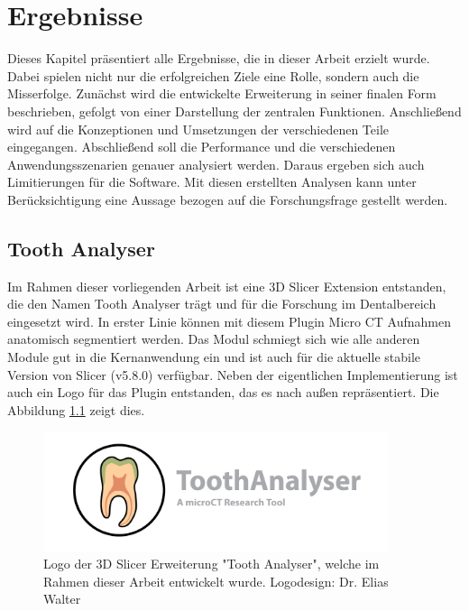\chapter{Ergebnisse}
\label{chap:ergebnisse} Dieses Kapitel präsentiert alle Ergebnisse, die in
dieser Arbeit erzielt wurde. Dabei spielen nicht nur die erfolgreichen Ziele eine
Rolle, sondern auch die Misserfolge. Zunächst wird die entwickelte Erweiterung in
seiner finalen Form beschrieben, gefolgt von einer Darstellung der zentralen
Funktionen. Anschließend wird auf die Konzeptionen und Umsetzungen der verschiedenen
Teile eingegangen. Abschließend soll die Performance und die verschiedenen
Anwendungsszenarien genauer analysiert werden. Daraus ergeben sich auch Limitierungen
für die Software. Mit diesen erstellten Analysen kann unter Berücksichtigung
eine Aussage bezogen auf die Forschungsfrage gestellt werden.

\section{Tooth Analyser}
\label{sec:tooth_analyser} Im Rahmen dieser vorliegenden Arbeit ist eine 3D
Slicer Extension entstanden, die den Namen Tooth Analyser trägt und für die Forschung
im Dentalbereich eingesetzt wird. In erster Linie können mit diesem Plugin Micro
CT Aufnahmen anatomisch segmentiert werden. Das Modul schmiegt sich wie alle anderen
Module gut in die Kernanwendung ein und ist auch für die aktuelle stabile Version
von Slicer (v5.8.0) verfügbar. Neben der eigentlichen Implementierung ist auch
ein Logo für das Plugin entstanden, das es nach außen repräsentiert. Die
Abbildung \ref{fig:logo_tooth_analyser} zeigt dies.

\begin{figure}[h]
	\centering
	\includegraphics[width=0.9\textwidth]{img/SlicerToothAnalyser.png}
	\caption{Logo der 3D Slicer Erweiterung "Tooth Analyser", welche im Rahmen dieser
	Arbeit entwickelt wurde. Logodesign: Dr. Elias Walter}
	\label{fig:logo_tooth_analyser}
\end{figure}

